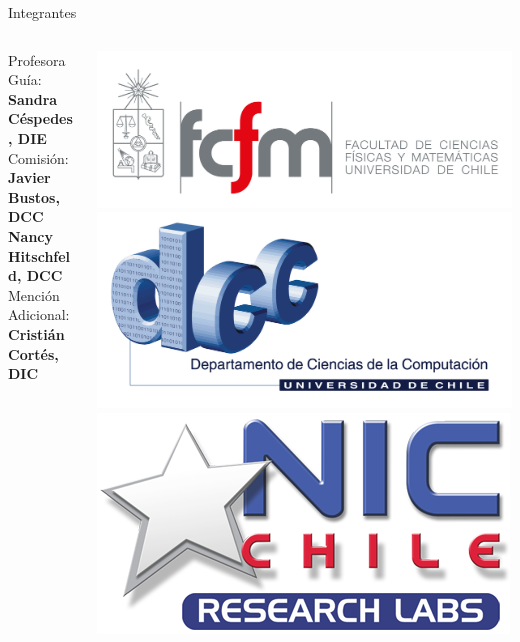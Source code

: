 \documentclass[aspectratio=169]{beamer}
\begin{document}
\begin{frame}{Integrantes}
\begin{columns}
    \begin{column}{.5\textwidth}
        Profesora Guía:\\
        \textbf{Sandra Céspedes, DIE}\\
        \vspace{\belowdisplayskip}
        Comisión:\\
        \textbf{Javier Bustos, DCC}\\
        \textbf{Nancy Hitschfeld, DCC}\\
        \vspace{\belowdisplayskip}
        Mención Adicional:\\
        \textbf{Cristián Cortés, DIC}
    \end{column}%
    \begin{column}{.5\textwidth}
        \centering
        \includegraphics[height=.25\textheight]{figuras/fcfm_horizontal_png.png}\\
        \vspace{0.05\textheight}
        \includegraphics[height=.25\textheight]{figuras/dcc_antiguo_png.png}\\
        \vspace{0.05\textheight}
        \includegraphics[height=.25\textheight]{figuras/niclabs.png}    

\end{column}
\end{columns}
\end{frame}
\end{document}
